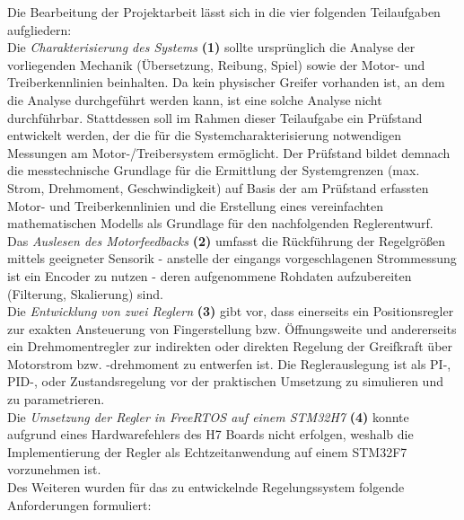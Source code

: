 Die Bearbeitung der Projektarbeit lässt sich in die vier folgenden Teilaufgaben aufgliedern:\\
Die \textit{Charakterisierung des Systems} \textbf{(1)} sollte ursprünglich die Analyse der vorliegenden Mechanik (Übersetzung, Reibung, Spiel) sowie der Motor- und Treiberkennlinien beinhalten. Da kein physischer Greifer vorhanden ist, an dem die Analyse durchgeführt werden kann, ist eine solche Analyse nicht durchführbar. Stattdessen soll im Rahmen dieser Teilaufgabe ein Prüfstand entwickelt werden, der die für die Systemcharakterisierung notwendigen Messungen am Motor-/Treibersystem ermöglicht. Der Prüfstand bildet demnach die messtechnische Grundlage für die Ermittlung der Systemgrenzen (max. Strom, Drehmoment, Geschwindigkeit) auf Basis der am Prüfstand erfassten Motor- und Treiberkennlinien und die Erstellung eines vereinfachten mathematischen Modells als Grundlage für den nachfolgenden Reglerentwurf. \\ %
Das \textit{Auslesen des Motorfeedbacks} \textbf{(2)} umfasst die Rückführung der Regelgrößen mittels geeigneter Sensorik - anstelle der eingangs vorgeschlagenen Strommessung ist ein Encoder zu nutzen - deren aufgenommene Rohdaten aufzubereiten (Filterung, Skalierung) sind.\\
Die \textit{Entwicklung von zwei Reglern} \textbf{(3)} gibt vor, dass einerseits ein Positionsregler zur exakten Ansteuerung von Fingerstellung bzw. Öffnungsweite und andererseits ein Drehmomentregler zur indirekten oder direkten Regelung der Greifkraft über Motorstrom bzw. -drehmoment zu entwerfen ist. Die Reglerauslegung ist als PI-, PID-, oder Zustandsregelung vor der praktischen Umsetzung zu simulieren und zu parametrieren.\\
Die \textit{Umsetzung der Regler in FreeRTOS auf einem STM32H7} \textbf{(4)} konnte aufgrund eines Hardwarefehlers des H7 Boards nicht erfolgen, weshalb die Implementierung der Regler als Echtzeitanwendung auf einem STM32F7 vorzunehmen ist.\\

Des Weiteren wurden für das zu entwickelnde Regelungssystem folgende Anforderungen formuliert:

